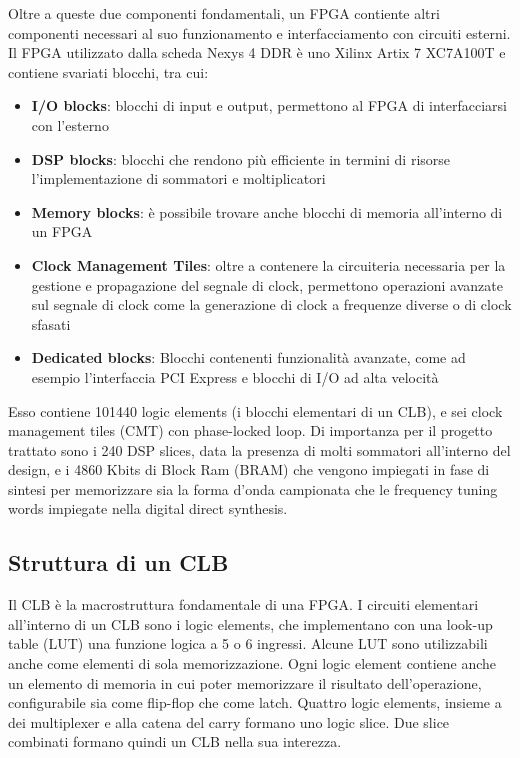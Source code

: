 Oltre a queste due componenti fondamentali, un FPGA contiente altri
componenti necessari al suo funzionamento e interfacciamento con
circuiti esterni.
Il FPGA utilizzato dalla scheda Nexys 4 DDR è uno Xilinx Artix 7 XC7A100T
e contiene svariati blocchi\cite{artix7overview}, tra cui:

\begin{itemize}
    \item \textbf{I/O blocks}: blocchi di input e output,
           permettono al FPGA di interfacciarsi con l'esterno
    \item \textbf{DSP blocks}: blocchi che rendono più efficiente in termini
           di risorse l'implementazione di sommatori e moltiplicatori
    \item \textbf{Memory blocks}: è possibile trovare anche blocchi di
           memoria all'interno di un FPGA
    \item \textbf{Clock Management Tiles}: oltre a contenere la circuiteria
            necessaria per la gestione e propagazione del segnale di clock,
            permettono operazioni avanzate sul segnale di clock come la
            generazione di clock a frequenze diverse o di clock sfasati
    \item \textbf{Dedicated blocks}: Blocchi contenenti funzionalità avanzate,
            come ad esempio l'interfaccia PCI Express e blocchi di I/O ad alta
            velocità
\end{itemize}

Esso contiene 101440 logic elements (i blocchi elementari di un CLB), e sei
clock management tiles (CMT) con phase-locked loop.
Di importanza per il progetto trattato sono i 240 DSP slices, 
data la presenza di molti sommatori all'interno del design,
 e i 4860 Kbits di Block Ram (BRAM) che vengono impiegati in fase di 
sintesi per memorizzare sia la forma d'onda campionata che
le frequency tuning words impiegate nella digital direct synthesis.

\subsection{Struttura di un CLB}
Il CLB è la macrostruttura fondamentale di una FPGA.
I circuiti elementari all'interno di un CLB sono i logic elements, che implementano
con una look-up table (LUT) una funzione logica a 5 o 6 ingressi.
Alcune LUT sono utilizzabili anche come elementi di sola memorizzazione.
Ogni logic element contiene anche un elemento di memoria in cui poter memorizzare il risultato
dell'operazione, configurabile sia come flip-flop che come latch.
 Quattro logic elements, insieme a dei multiplexer e alla catena
del carry formano uno logic slice.
Due slice combinati formano quindi un CLB nella sua interezza.

